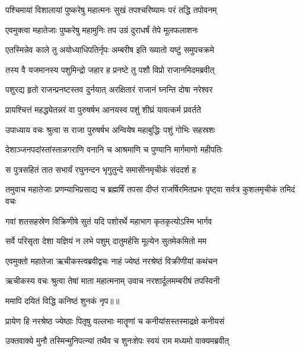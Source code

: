 \twolineshloka
{पश्चिमायां विशालायां पुष्करेषु महात्मनः}
{सुखं तपश्चरिष्यामः परं तद्धि तपोवनम्} %

\twolineshloka
{एवमुक्त्वा महातेजाः पुष्करेषु महामुनिः}
{तप उग्रं दुराधर्षं तेपे मूलफलाशनः} %

\twolineshloka
{एतस्मिन्नेव काले तु अयोध्याधिपतिर्नृपः}
{अम्बरीष इति ख्यातो यष्टुं समुपचक्रमे} %

\twolineshloka
{तस्य वै यजमानस्य पशुमिन्द्रो जहार ह}
{प्रनष्टे तु पशौ विप्रो राजानमिदमब्रवीत्} %

\twolineshloka
{पशुरद्य हृतो राजन्प्रनष्टस्तव दुर्नयात्}
{अरक्षितारं राजानं घ्नन्ति दोषा नरेश्वर} %

\twolineshloka
{प्रायश्चित्तं महद्ध्येतन्नरं वा पुरुषर्षभ}
{आनयस्व पशुं शीघ्रं यावत्कर्म प्रवर्तते} %

\twolineshloka
{उपाध्याय वचः श्रुत्वा स राजा पुरुषर्षभ}
{अन्वियेष महाबुद्धिः पशुं गोभिः सहस्रशः} %

\twolineshloka
{देशाञ्जनपदांस्तांस्तान्नगराणि वनानि च}
{आश्रमाणि च पुण्यानि मार्गमाणो महीपतिः} %

\twolineshloka
{स पुत्रसहितं तात सभार्यं रघुनन्दन}
{भृगुतुन्दे समासीनमृचीकं संददर्श ह} %

\threelineshloka
{तमुवाच महातेजाः प्रणम्याभिप्रसाद्य च}
{ब्रह्मर्षिं तपसा दीप्तं राजर्षिरमितप्रभः}
{पृष्ट्वा सर्वत्र कुशलमृचीकं तमिदं वचः} %

\twolineshloka
{गवां शतसहस्रेण विक्रिणीषे सुतं यदि}
{पशोरर्थे महाभाग कृतकृत्योऽस्मि भार्गव} %

\twolineshloka
{सर्वे परिसृता देशा यज्ञियं न लभे पशुम्}
{दातुमर्हसि मूल्येन सुतमेकमितो मम} %

\twolineshloka
{एवमुक्तो महातेजा ऋचीकस्त्वब्रवीद्वचः}
{नाहं ज्येष्ठं नरश्रेष्ठं विक्रीणीयां कथंचन} %

\twolineshloka
{ऋचीकस्य वचः श्रुत्वा तेषां माता महात्मनाम्}
{उवाच नरशार्दूलमम्बरीषं तपस्विनी} %

{ममापि दयितं विद्धि कनिष्ठं शुनकं नृप॥॥} %

\addtocounter{shlokacount}{1}

\twolineshloka
{प्रायेण हि नरश्रेष्ठ ज्येष्ठाः पितृषु वल्लभाः}
{मातॄणां च कनीयांसस्तस्माद्रक्षे कनीयसं} %

\twolineshloka
{उक्तवाक्ये मुनौ तस्मिन्मुनिपत्न्यां तथैव च}
{शुनःशेपः स्वयं राम मध्यमो वाक्यमब्रवीत्} %

